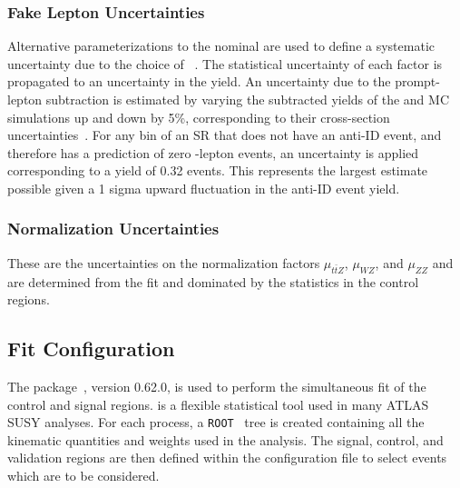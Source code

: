 \subsubsection{Fake Lepton Uncertainties}
\label{sec:stats:systs:fakes}
Alternative parameterizations to the nominal \ptcone are used to define a systematic uncertainty due to the choice of \ptcone ~\cite{ATLAS:2020uer}.
The statistical uncertainty of each \fake factor is propagated to an uncertainty in the yield.
An uncertainty due to the prompt-lepton subtraction is estimated by varying the subtracted yields of the \WZ and \ZZ MC simulations up and down by 5\%, corresponding to their cross-section uncertainties~\cite{STDM-2018-03}.
For any \mZl bin of an SR that does not have an anti-ID event, and therefore has a prediction of zero \fake-lepton events, an uncertainty is applied corresponding to a yield of 0.32 \fake events.
This represents the largest \fake estimate possible given a 1 sigma upward fluctuation in the anti-ID event yield.

\subsubsection{Normalization Uncertainties}
\label{sec:stats:systs:normalization}
These are the uncertainties on the normalization factors $\mu_{t\bar{t}Z}$, $\mu_{
WZ}$, and $\mu_{ZZ}$ and are determined from the fit and dominated by the statistics in the control regions.



\subsection{Fit Configuration}
The \Histfitter package~\cite{Baak:2014wma}, version 0.62.0, is used to perform the simultaneous fit of the control and signal regions.
\Histfitter is a flexible statistical tool used in many ATLAS SUSY analyses.
For each process, a \texttt{ROOT}~\cite{ROOT} tree is created containing all the kinematic quantities and weights used in the analysis.
The signal, control, and validation regions are then defined within the \Histfitter configuration file to select events which are to be considered.


